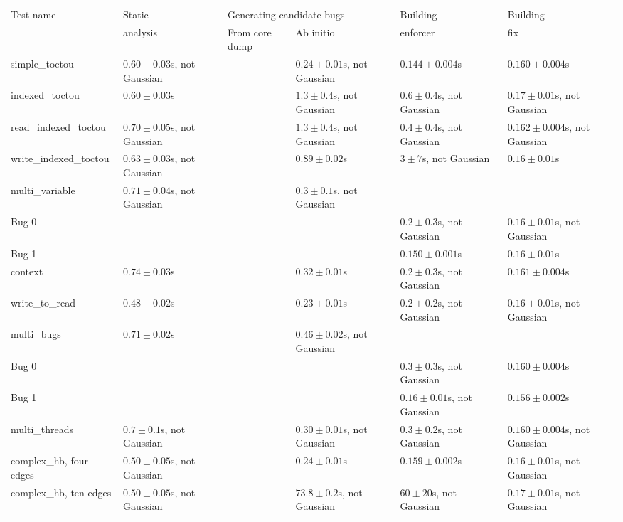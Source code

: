 \begin{tabular}{l|p{3.6cm}|p{3.6cm}|p{3.6cm}|p{3.6cm}|p{3.6cm}}
Test name              & Static                  & \multicolumn{2}{l|}{Generating candidate bugs} & Building & Building \\
\cline{3-4}            & analysis                & From core dump & Ab initio                     & enforcer & fix      \\
\hline
\hline{}simple\_toctou         & $0.60 \pm 0.03$s, not Gaussian &        & $0.24 \pm 0.01$s, not Gaussian & $0.144 \pm 0.004$s   & $0.160 \pm 0.004$s   \\
\hline{}indexed\_toctou        & $0.60 \pm 0.03$s     &        & $1.3 \pm 0.4$s, not Gaussian & $0.6 \pm 0.4$s, not Gaussian & $0.17 \pm 0.01$s, not Gaussian \\
\hline{}read\_indexed\_toctou  & $0.70 \pm 0.05$s, not Gaussian &        & $1.3 \pm 0.4$s, not Gaussian & $0.4 \pm 0.4$s, not Gaussian & $0.162 \pm 0.004$s, not Gaussian \\
\hline{}write\_indexed\_toctou & $0.63 \pm 0.03$s, not Gaussian &        & $0.89 \pm 0.02$s     & $3 \pm 7$s, not Gaussian & $0.16 \pm 0.01$s     \\
\hline{}multi\_variable        & $0.71 \pm 0.04$s, not Gaussian &        & $0.3 \pm 0.1$s, not Gaussian & \\
\hspace{20pt}Bug 0     & & & & $0.2 \pm 0.3$s, not Gaussian & $0.16 \pm 0.01$s, not Gaussian \\
\hspace{20pt}Bug 1     & & & & $0.150 \pm 0.001$s   & $0.16 \pm 0.01$s     \\
\hline{}context                & $0.74 \pm 0.03$s     &        & $0.32 \pm 0.01$s     & $0.2 \pm 0.3$s, not Gaussian & $0.161 \pm 0.004$s   \\
\hline{}write\_to\_read        & $0.48 \pm 0.02$s     &        & $0.23 \pm 0.01$s     & $0.2 \pm 0.2$s, not Gaussian & $0.16 \pm 0.01$s, not Gaussian \\
\hline{}multi\_bugs            & $0.71 \pm 0.02$s     &        & $0.46 \pm 0.02$s, not Gaussian & \\
\hspace{20pt}Bug 0     & & & & $0.3 \pm 0.3$s, not Gaussian & $0.160 \pm 0.004$s   \\
\hspace{20pt}Bug 1     & & & & $0.16 \pm 0.01$s, not Gaussian & $0.156 \pm 0.002$s   \\
\hline{}multi\_threads         & $0.7 \pm 0.1$s, not Gaussian &        & $0.30 \pm 0.01$s, not Gaussian & $0.3 \pm 0.2$s, not Gaussian & $0.160 \pm 0.004$s, not Gaussian \\
\hline{}complex\_hb, four edges & $0.50 \pm 0.05$s, not Gaussian &        & $0.24 \pm 0.01$s     & $0.159 \pm 0.002$s   & $0.16 \pm 0.01$s, not Gaussian \\
\hline{}complex\_hb, ten edges & $0.50 \pm 0.05$s, not Gaussian &        & $73.8 \pm 0.2$s, not Gaussian & $60 \pm 20$s, not Gaussian & $0.17 \pm 0.01$s, not Gaussian \\
\end{tabular}
